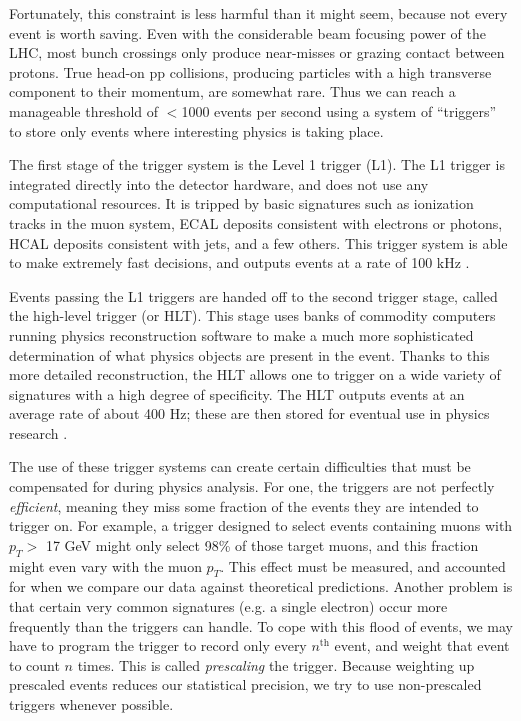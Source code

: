 Fortunately, this constraint is less harmful than it might seem,
because not every event is worth saving. Even with the
considerable beam focusing power of the LHC, most bunch crossings only produce
near-misses or grazing contact between protons. True head-on pp
collisions, producing particles with a high transverse component to
their momentum, are somewhat rare. Thus we can reach a manageable threshold of
$<$1000 events per second using a system of ``triggers'' to store only
events where interesting physics is taking place.

The first stage of the trigger system is the Level 1 trigger
(L1). The L1 trigger is integrated directly into the detector
hardware, and does not use any computational resources. It
is tripped by basic signatures such as ionization tracks in the muon system, ECAL
deposits consistent with electrons or photons, HCAL deposits
consistent with jets, and a few others. This trigger system is able to
make extremely fast decisions, and outputs events at a rate of 100
kHz \cite{trigger}.

Events passing the L1 triggers are handed off to the second trigger
stage, called the high-level trigger (or HLT). This stage uses
banks of commodity computers running physics reconstruction
software to make a much more sophisticated determination of what
physics objects are present in the event. Thanks to this more
detailed reconstruction, the HLT allows one to trigger on a wide
variety of signatures with a high degree of specificity. The HLT
outputs events at an average
rate of about 400 Hz; these are then stored for eventual use in
physics research \cite{trigger}.

The use of these trigger systems can create certain difficulties
that must be compensated for during physics analysis. For one, the
triggers are not perfectly \emph{efficient},
meaning they miss some fraction of the events they are intended to
trigger on. For example, a trigger designed to select events
containing muons with $p_T >$ 17 GeV might only select 98\% of those
target muons, and this fraction might even vary with the muon
$p_T$. This effect must be measured, and accounted for when we compare
our data against theoretical predictions. Another problem is that
certain very common signatures (e.g. a single electron) occur more
frequently than the triggers can handle. To cope with this flood of
events, we may have to program the trigger to record only every
$n^\text{th}$ event, and weight that event to count $n$
times. This is called \emph{prescaling} the trigger. Because
weighting up prescaled events reduces our statistical precision, we
try to use non-prescaled triggers whenever possible.

